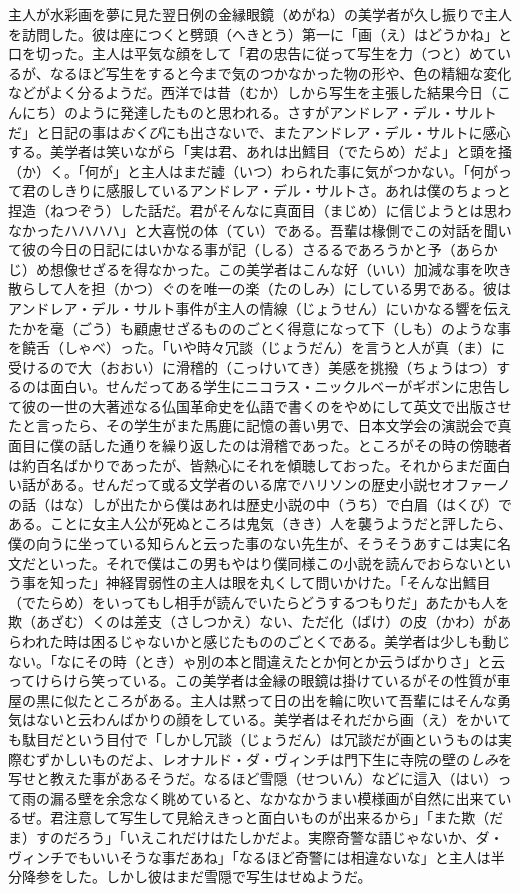 \documentclass{book}
\begin{document}
主人が水彩画を夢に見た翌日例の金縁眼鏡（めがね）の美学者が久し振りで主人を訪問した。彼は座につくと劈頭（へきとう）第一に「画（え）はどうかね」と口を切った。主人は平気な顔をして「君の忠告に従って写生を力（つと）めているが、なるほど写生をすると今まで気のつかなかった物の形や、色の精細な変化などがよく分るようだ。西洋では昔（むか）しから写生を主張した結果今日（こんにち）のように発達したものと思われる。さすがアンドレア・デル・サルトだ」と日記の事は\emph{おくび}にも出さないで、またアンドレア・デル・サルトに感心する。美学者は笑いながら「実は君、あれは出鱈目（でたらめ）だよ」と頭を掻（か）く。「何が」と主人はまだ譃（いつ）わられた事に気がつかない。「何がって君のしきりに感服しているアンドレア・デル・サルトさ。あれは僕のちょっと捏造（ねつぞう）した話だ。君がそんなに真面目（まじめ）に信じようとは思わなかったハハハハ」と大喜悦の体（てい）である。吾輩は椽側でこの対話を聞いて彼の今日の日記にはいかなる事が記（しる）さるるであろうかと予（あらかじ）め想像せざるを得なかった。この美学者はこんな好（いい）加減な事を吹き散らして人を担（かつ）ぐのを唯一の楽（たのしみ）にしている男である。彼はアンドレア・デル・サルト事件が主人の情線（じょうせん）にいかなる響を伝えたかを毫（ごう）も顧慮せざるもののごとく得意になって下（しも）のような事を饒舌（しゃべ）った。「いや時々冗談（じょうだん）を言うと人が真（ま）に受けるので大（おおい）に滑稽的（こっけいてき）美感を挑撥（ちょうはつ）するのは面白い。せんだってある学生にニコラス・ニックルベーがギボンに忠告して彼の一世の大著述なる仏国革命史を仏語で書くのをやめにして英文で出版させたと言ったら、その学生がまた馬鹿に記憶の善い男で、日本文学会の演説会で真面目に僕の話した通りを繰り返したのは滑稽であった。ところがその時の傍聴者は約百名ばかりであったが、皆熱心にそれを傾聴しておった。それからまだ面白い話がある。せんだって或る文学者のいる席でハリソンの歴史小説セオファーノの話（はな）しが出たから僕はあれは歴史小説の中（うち）で白眉（はくび）である。ことに女主人公が死ぬところは鬼気（きき）人を襲うようだと評したら、僕の向うに坐っている知らんと云った事のない先生が、そうそうあすこは実に名文だといった。それで僕はこの男もやはり僕同様この小説を読んでおらないという事を知った」神経胃弱性の主人は眼を丸くして問いかけた。「そんな出鱈目（でたらめ）をいってもし相手が読んでいたらどうするつもりだ」あたかも人を欺（あざむ）くのは差支（さしつかえ）ない、ただ化（ばけ）の皮（かわ）があらわれた時は困るじゃないかと感じたもののごとくである。美学者は少しも動じない。「なにその時（とき）ゃ別の本と間違えたとか何とか云うばかりさ」と云ってけらけら笑っている。この美学者は金縁の眼鏡は掛けているがその性質が車屋の黒に似たところがある。主人は黙って日の出を輪に吹いて吾輩にはそんな勇気はないと云わんばかりの顔をしている。美学者はそれだから画（え）をかいても駄目だという目付で「しかし冗談（じょうだん）は冗談だが画というものは実際むずかしいものだよ、レオナルド・ダ・ヴィンチは門下生に寺院の壁の\emph{しみ}を写せと教えた事があるそうだ。なるほど雪隠（せついん）などに這入（はい）って雨の漏る壁を余念なく眺めていると、なかなかうまい模様画が自然に出来ているぜ。君注意して写生して見給えきっと面白いものが出来るから」「また欺（だま）すのだろう」「いえこれだけはたしかだよ。実際奇警な語じゃないか、ダ・ヴィンチでもいいそうな事だあね」「なるほど奇警には相違ないな」と主人は半分降参をした。しかし彼はまだ雪隠で写生はせぬようだ。
\end{document}
